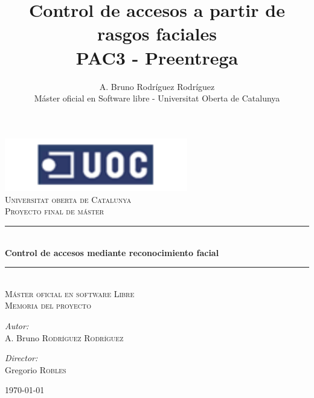 \documentclass[a4paper]{book}
\newcommand{\HRule}{\rule{\linewidth}{0.5mm}}
\begin{document}
\frontmatter
\title {Control de accesos a partir de rasgos faciales \\ \Large{PAC3 - Preentrega} }
\author {A. Bruno Rodríguez Rodríguez \\ \normalsize{Máster oficial en Software libre - Universitat Oberta de Catalunya}}
\date{}

\begin{titlepage}
\begin{center}
	\includegraphics[width=8cm]{uoc.png}\\[1.5cm]
 
	\textsc{\LARGE Universitat oberta de Catalunya}\\[2cm]

	\textsc{\Huge Proyecto final de máster}\\[1cm]

	\HRule \\[1cm]
	{ \LARGE \bfseries Control de accesos mediante reconocimiento facial}\\[1cm]
	\HRule \\[2cm]

	\textsc{\Large Máster oficial en software Libre}\\[1cm]

	\textsc{\Large Memoria del proyecto}\\[4cm]
 
	\begin{minipage}{0.4\textwidth}
	\begin{flushleft} \large
	\emph{Autor:}\\
	\small{A. Bruno \textsc{Rodríguez Rodríguez}}
	\end{flushleft}
	\end{minipage}
	\begin{minipage}{0.4\textwidth}
	\begin{flushright} \large
	\emph{Director:} \\
	Gregorio \textsc{Robles}
	\end{flushright}
	\end{minipage}

	\vfill
 
	{\large \today}
 
\end{center}
\end{titlepage}
\end{document}
